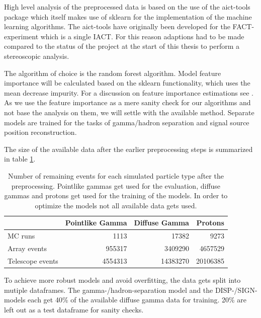 High level analysis of the preprocessed data is based on the use of
the aict-tools package \cite{aict-tools} which itself makes use of
sklearn \cite{sklearn_api} for the implementation of the machine learning algorithms.
The aict-tools have originally been developed for the FACT-experiment
which is a single IACT. 
For this reason
adaptions had to be made compared to the status of the project at the start 
of this thesis to perform a stereoscopic analysis.

The algorithm of choice is the random forest algorithm.
Model feature importance will be calculated
based on the sklearn functionality, which
uses the mean decrease impurity.
For a discussion on feature importance estimations see \cite{hastie2017springer}.
As we use the feature importance as a mere sanity check for our algorithms 
and not base the analysis on them, we will settle with the available method.
Separate models are trained for the tasks of gamma/hadron
separation and signal source position reconstruction.

The size of the available data after the earlier 
preprocessing steps is summarized in table \ref{tab:events_after_prep}.


\begin{table}
    \caption{Number of remaining events for each simulated particle type after the
    preprocessing. Pointlike gammas get used for the evaluation, diffuse gammas and protons
    get used for the training of the models. In order to optimize the models not all
    available data gets used.}
    \begin{center}
        \begin{tabular}{l r r r}
            & Pointlike Gamma & Diffuse Gamma & Protons \\
            \hline
            MC runs & \num{1113} & \num{17382} &  \num{9273} \\ 
            Array events & \num{955317} & \num{3409290} & \num{4657529} \\
            Telescope events & \num{4554313} & \num{14383270} & \num{20106385} \\
        \end{tabular}
    \end{center}
    \label{tab:events_after_prep}
\end{table}

To achieve more robust models and avoid overfitting, the data gets split into mutiple dataframes.
The gamma-/hadron-separation model and the DISP-/SIGN-models each get 
40\% of the available diffuse gamma data for training. 20\% are left out
as a test dataframe for sanity checks.

